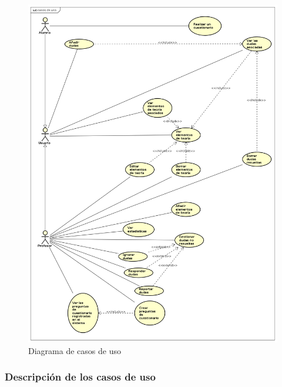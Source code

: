 \documentclass[openright,twoside,10pt]{book}
\begin{document}
    \begin{figure}[H]
        \begin{center}
            \includegraphics[scale=0.35]{img/astah/analisis/casos_de_uso/useCase00.png}
        \end{center}
        \caption{Diagrama de casos de uso}
    \end{figure}
    
    \newpage
    
    \subsubsection{Descripción de los casos de
    uso}\label{descripciuxf3n-de-los-casos-de-uso}
    
    \vspace*{\fill}
    
\end{document}
